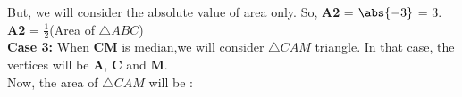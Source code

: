 But, we will consider the absolute value of area only. So, \textbf{A2} = $\abs{-3}$ = 3.\\
 \textbf{A2} = $\frac{1}{2}$(Area of $\triangle ABC$)\\
\textbf{Case 3:} When \textbf{CM} is median,we will consider $ \triangle CAM $ triangle. In that case, the vertices will be \textbf{A}, \textbf{C} and \textbf{M}.\\
Now, the area of $ \triangle CAM $ will be :\\
